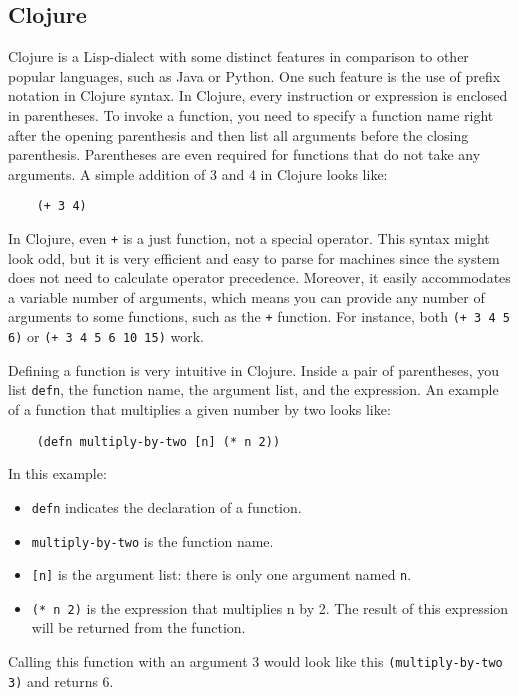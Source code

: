 \documentclass[12pt]{article}
\newcommand{\comment}[1]{{\bf \tt  {#1}}}
\newcommand{\emcomment}[1]{\textcolor{ForestGreen}{\comment{Elena: {#1}}}}
\newcommand{\tscomment}[1]{\textcolor{Teal}{\comment{Tony: {#1}}}}
\begin{document}
	\subsection{Clojure}\label{sec:clojure}
	Clojure is a Lisp-dialect with some distinct features in comparison to other popular languages, such as Java or Python.
	One such feature is the use of prefix notation in Clojure syntax. In Clojure, every instruction or expression is enclosed in parentheses.
	To invoke a function, you need to specify a function name right after the opening parenthesis and then list all arguments before the 
	closing parenthesis. Parentheses are even required for functions that do not take any arguments.  
	A simple addition of 3 and 4 in Clojure looks like: 
	\begin{verbatim}
	(+ 3 4)
	\end{verbatim}
	In Clojure, even \texttt{+} is a just function, not a special operator. This syntax might look odd, but it is very efficient and easy to parse for machines since the system does not need to 
	calculate operator precedence. Moreover, it easily accommodates a variable number of arguments, which means
	you can provide any number of arguments to some functions, such as the {\tt +} function. For instance,  both {\tt (+ 3 4 5 6)}
	or {\tt (+ 3 4 5 6 10 15)} work.
	
	Defining a function is very intuitive in Clojure. Inside a pair of parentheses, you list \texttt{defn}, the function name, 
	the argument list, and the expression.
	An example of a function that multiplies a given number by two looks like:
	\begin{verbatim}
	(defn multiply-by-two [n] (* n 2))
	\end{verbatim}
	In this example:
	\begin{itemize}
	\item {\tt defn} indicates the declaration of a function.
	\item {\tt multiply-by-two} is the function name.
	\item \texttt{[n]} is the argument list: there is only one argument named {\tt n}.
	\item {\tt (* n 2)} is the expression that multiplies n by 2. The result of this expression will be returned from the function. 
	\end{itemize}
	Calling this function with an argument 3 would look like this {\tt (multiply-by-two 3)} and returns 6.
	
\end{document}
